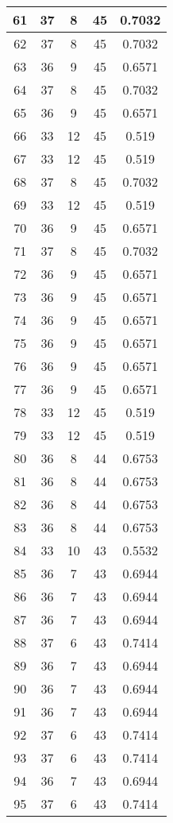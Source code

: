 \documentclass[letterpaper, 12pt]{article}
\begin{document}
\begin{longtable}{|c|c|c|c|c|}
\hline
61 & 37 & 8 & 45 & 0.7032 \\
\hline
62 & 37 & 8 & 45 & 0.7032 \\
\hline
63 & 36 & 9 & 45 & 0.6571 \\
\hline
64 & 37 & 8 & 45 & 0.7032 \\
\hline
65 & 36 & 9 & 45 & 0.6571 \\
\hline
66 & 33 & 12 & 45 & 0.519 \\
\hline
67 & 33 & 12 & 45 & 0.519 \\
\hline
68 & 37 & 8 & 45 & 0.7032 \\
\hline
69 & 33 & 12 & 45 & 0.519 \\
\hline
70 & 36 & 9 & 45 & 0.6571 \\
\hline
71 & 37 & 8 & 45 & 0.7032 \\
\hline
72 & 36 & 9 & 45 & 0.6571 \\
\hline
73 & 36 & 9 & 45 & 0.6571 \\
\hline
74 & 36 & 9 & 45 & 0.6571 \\
\hline
75 & 36 & 9 & 45 & 0.6571 \\
\hline
76 & 36 & 9 & 45 & 0.6571 \\
\hline
77 & 36 & 9 & 45 & 0.6571 \\
\hline
78 & 33 & 12 & 45 & 0.519 \\
\hline
79 & 33 & 12 & 45 & 0.519 \\
\hline
80 & 36 & 8 & 44 & 0.6753 \\
\hline
81 & 36 & 8 & 44 & 0.6753 \\
\hline
82 & 36 & 8 & 44 & 0.6753 \\
\hline
83 & 36 & 8 & 44 & 0.6753 \\
\hline
84 & 33 & 10 & 43 & 0.5532 \\
\hline
85 & 36 & 7 & 43 & 0.6944 \\
\hline
86 & 36 & 7 & 43 & 0.6944 \\
\hline
87 & 36 & 7 & 43 & 0.6944 \\
\hline
88 & 37 & 6 & 43 & 0.7414 \\
\hline
89 & 36 & 7 & 43 & 0.6944 \\
\hline
90 & 36 & 7 & 43 & 0.6944 \\
\hline
91 & 36 & 7 & 43 & 0.6944 \\
\hline
92 & 37 & 6 & 43 & 0.7414 \\
\hline
93 & 37 & 6 & 43 & 0.7414 \\
\hline
94 & 36 & 7 & 43 & 0.6944 \\
\hline
95 & 37 & 6 & 43 & 0.7414 \\

\end{longtable}
\end{document}
